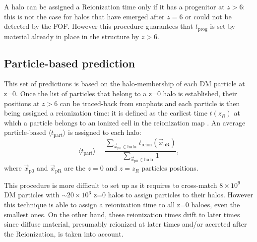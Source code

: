 \documentclass[twocolumn]{aastex61}
\begin{document}
A halo can be assigned a Reionization time only if it has a progenitor at $z>6$: this is not the case for halos that have emerged after $z=6$ or could not be detected by the FOF. %
However this procedure guarantees that $t_\mathrm{prog}$ is set by material already in place in the structure by $z>6$.

\subsection{Particle-based prediction}
This set of predictions is based on the halo-membership of each DM particle at z=0. %
 Once the list of particles that belong to a z=0 halo is established, their positions at $z>6$ can be traced-back from snaphots and each particle is then being assigned a reionization time: it is defined as the earliest time $t(z_R)$ at which a particle belongs to an ionized cell in the reionization map . An average particle-based $\langle t_\mathrm{part} \rangle$  is assigned to each halo:
\begin{equation}
\langle t_\mathrm{part}\rangle=\frac{\sum_{\vec x_\mathrm{p0} \in \mathrm{halo} \ } t_\mathrm{reion}(\vec x_\mathrm{pR})}{\sum_{\vec x_\mathrm{p0} \in \mathrm{halo} \ } 1},
\end{equation}
where $\vec x_\mathrm{p0}$ and $\vec x_\mathrm{pR}$ are the $z=0$ and $z=z_R$ particles positions.

This procedure is more difficult to set up as it requires to cross-match $8\times 10^9$ DM particles with $\sim 20\times 10^6$ z=0 halos  to assign particles to their halos. 
However this technique is able to assign a reionization time to all z=0 haloes, even the smallest ones. On the other hand, these reionization times drift to later times since diffuse material, presumably reionized at later times and/or  accreted after the Reionization, is taken into account. 
 
% 
\end{document}
